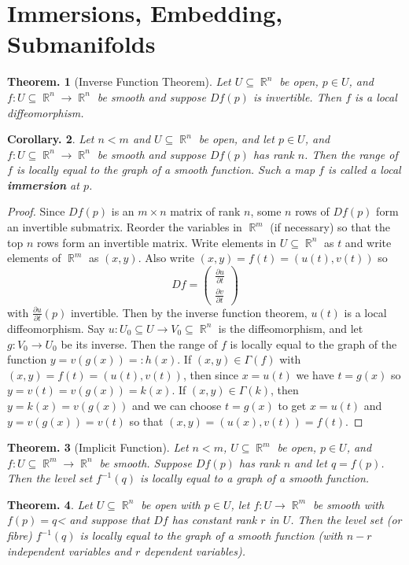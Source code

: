 \documentclass[11pt, a4paper]{memoir}
\DeclareMathOperator{\R}{{\mathbb{R}}}
\theoremstyle{change}
\newtheorem{theorem}{Theorem.}[section]
\newtheorem{corollary}[theorem]{Corollary.}
\theoremstyle{plain}
\theoremstyle{nonumberplain}
\newtheorem{proof}{Proof}
\newcommand{\prt}[2]{\ensuremath{\frac{\partial #1}{\partial #2}}}
\numberwithin{equation}{section}
\begin{document}
\section{Immersions, Embedding, Submanifolds}
\begin{theorem}[Inverse Function Theorem]
    Let $U\subseteq\R^n$ be open, $p\in U$, and $f:U\subseteq\R^n\to\R^n$ be smooth and suppose $Df(p)$ is invertible.
    Then $f$ is a local diffeomorphism.
\end{theorem}
\begin{corollary}
    Let $n<m$ and $U\subseteq\R^n$ be open, and let $p\in U$, and $f:U\subseteq\R^n\to\R^n$ be smooth and suppose $Df(p)$ has rank $n$.
    Then the range of $f$ is locally equal to the graph of a smooth function.
    Such a map $f$ is called a local \textbf{immersion} at $p$.
\end{corollary}
\begin{proof}
    Since $Df(p)$ is an $m\times n$ matrix of rank $n$, some $n$ rows of $Df(p)$ form an invertible submatrix.
    Reorder the variables in $\R^m$ (if necessary) so that the top $n$ rows form an invertible matrix.
    Write elements in $U\subseteq\R^n$ as $t$ and write elements of $\R^m$ as $(x,y)$.
    Also write $(x,y)=f(t)=(u(t),v(t))$ so
    \begin{equation*}
        Df=\begin{pmatrix}\prt{u}{t}\\\prt{v}{t}\end{pmatrix}
    \end{equation*}
    with $\prt{u}{t}(p)$ invertible.
    Then by the inverse function theorem, $u(t)$ is a local diffeomorphism.
    Say $u:U_0\subseteq U\to V_0\subseteq\R^n$ is the diffeomorphism, and let $g:V_0\to U_0$ be its inverse.
    Then the range of $f$ is locally equal to the graph of the function $y=v(g(x))=:h(x)$.
    If $(x,y)\in\Gamma(f)$ with $(x,y)=f(t)=(u(t),v(t))$, then since $x=u(t)$ we have $t=g(x)$ so $y=v(t)=v(g(x))=k(x)$.
    If $(x,y)\in\Gamma(k)$, then $y=k(x)=v(g(x))$ and we can choose $t=g(x)$ to get $x=u(t)$ and $y=v(g(x))=v(t)$ so that $(x,y)=(u(x),v(t))=f(t)$.
\end{proof}
\begin{theorem}[Implicit Function]
    Let $n<m$, $U\subseteq\R^m$ be open, $p\in U$, and $f:U\subseteq\R^m\to\R^n$ be smooth.
    Suppose $Df(p)$ has rank $n$ and let $q=f(p)$.
    Then the level set $f^{-1}(q)$ is locally equal to a graph of a smooth function.
\end{theorem}
\begin{theorem}
    Let $U\subseteq\R^n$ be open with $p\in U$, let $f:U\to\R^m$ be smooth with $f(p)=q$< and suppose that $Df$ has constant rank $r$ in $U$.
    Then the level set (or fibre) $f^{-1}(q)$ is locally equal to the graph of a smooth function (with $n-r$ independent variables and $r$ dependent variables).
\end{theorem}
\end{document}
